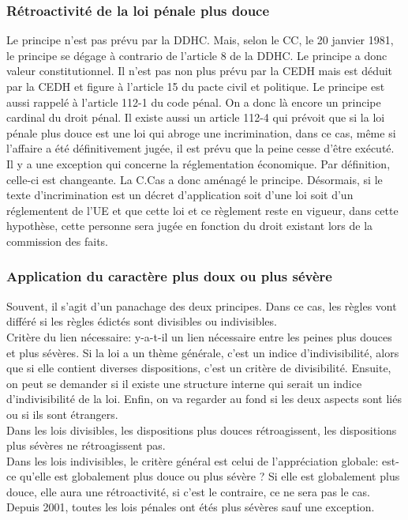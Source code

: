 \documentclass[10pt, a4paper, openany]{book}
\begin{document}
\subsubsection{Rétroactivité de la loi pénale plus douce}

Le principe n'est pas prévu par la DDHC. Mais, selon le CC, le 20 janvier 1981, le principe se dégage à contrario de l'article 8 de la DDHC. Le principe a donc valeur constitutionnel. Il n'est pas non plus prévu par la CEDH mais est déduit par la CEDH et figure à l'article 15 du pacte civil et politique. Le principe est aussi rappelé à l'article 112-1 du code pénal. On a donc là encore un principe cardinal du droit pénal. Il existe aussi un article 112-4 qui prévoit que si la loi pénale plus douce est une loi qui abroge une incrimination, dans ce cas, même si l'affaire a été définitivement jugée, il est prévu que la peine cesse d'être exécuté. \\
Il y a une exception qui concerne la réglementation économique. Par définition, celle-ci est changeante. La C.Cas a donc aménagé le principe. Désormais, si le texte d'incrimination est un décret d'application soit d'une loi soit d'un réglementent de l'UE et que cette loi et ce règlement reste en vigueur, dans cette hypothèse, cette personne sera jugée en fonction du droit existant lors de la commission des faits. 

\subsubsection{Application du caractère plus doux ou plus sévère}

Souvent, il s'agit d'un panachage des deux principes. Dans ce cas, les règles vont différé si les règles édictés sont divisibles ou indivisibles. \\
Critère du lien nécessaire: y-a-t-il un lien nécessaire entre les peines plus douces et plus sévères. Si la loi a un thème générale, c'est un indice d'indivisibilité, alors que si elle contient diverses dispositions, c'est un critère de divisibilité. Ensuite, on peut se demander si il existe une structure interne qui serait un indice d'indivisibilité de la loi. Enfin, on va regarder au fond si les deux aspects sont liés ou si ils sont étrangers. \\
Dans les lois divisibles, les dispositions plus douces rétroagissent, les dispositions plus sévères ne rétroagissent pas. \\
Dans les lois indivisibles, le critère général est celui de l'appréciation globale: est-ce qu'elle est globalement plus douce ou plus sévère ? Si elle est globalement plus douce, elle aura une rétroactivité, si c'est le contraire, ce ne sera pas le cas. Depuis 2001, toutes les lois pénales ont étés plus sévères sauf une exception. 
\end{document}

